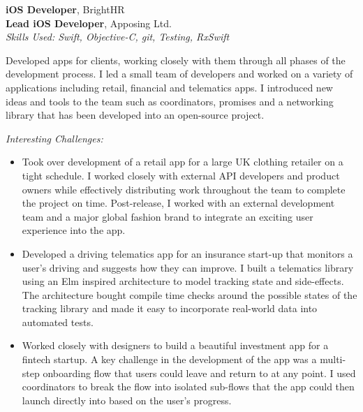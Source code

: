 %
\textbf{iOS Developer}, BrightHR \\

\textbf{Lead iOS Developer}, Apposing Ltd. \\
\textit{Skills Used: Swift, Objective-C, git, Testing, RxSwift}

Developed apps for clients, working closely with them through all phases of the
development process. I led a small team of developers and worked on a variety of
applications including retail, financial and telematics apps. I introduced new
ideas and tools to the team such as coordinators, promises and a networking
library that has been developed into an open-source project.

\medskip

\textit{Interesting Challenges:}

\smallskip

\begin{itemize}
\item Took over development of a retail app for a large UK clothing retailer on
  a tight schedule. I worked closely with external API developers and product
  owners while effectively distributing work throughout the team to complete the
  project on time. Post-release, I worked with an external development team and
  a major global fashion brand to integrate an exciting user experience into the
  app.

\item Developed a driving telematics app for an insurance start-up that monitors
  a user's driving and suggests how they can improve. I built a telematics
  library using an Elm inspired architecture to model tracking state and
  side-effects. The architecture bought compile time checks around the possible
  states of the tracking library and made it easy to incorporate real-world data
  into automated tests.

\item Worked closely with designers to build a beautiful investment app for a
  fintech startup. A key challenge in the development of the app was a
  multi-step onboarding flow that users could leave and return to at any
  point. I used coordinators to break the flow into isolated sub-flows that the
  app could then launch directly into based on the user's progress.

\end{itemize}

\bigskip

